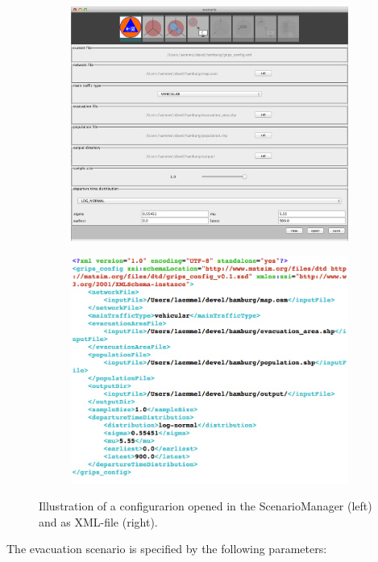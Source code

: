 \begin{figure}[!ht]
\begin{subfigure}
\centering
\includegraphics[width=.475\linewidth]{extending/figures/Evacuation/grips_config}
\end{subfigure}\hfill
\begin{subfigure}
\centering
\includegraphics[width=.475\linewidth]{extending/figures/Evacuation/grips_config_xml}
\end{subfigure}
\caption{Illustration of a configurarion opened in the \mbox{ScenarioManager} (left) and as XML-file (right).}\label{chap:evac:fig:sc_man}
\end{figure}
The evacuation scenario is specified by the following parameters:
